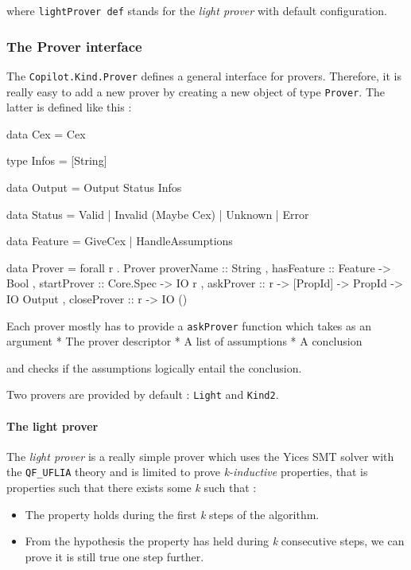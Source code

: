 where \texttt{lightProver def} stands for the \emph{light prover} with
default configuration.

\subsubsection{The Prover interface}\label{the-prover-interface}

The \texttt{Copilot.Kind.Prover} defines a general interface for
provers. Therefore, it is really easy to add a new prover by creating a
new object of type \texttt{Prover}. The latter is defined like this :

\begin{code}
data Cex = Cex

type Infos = [String]

data Output = Output Status Infos

data Status
  = Valid
  | Invalid (Maybe Cex)
  | Unknown
  | Error
  
data Feature = GiveCex | HandleAssumptions
  
data Prover = forall r . Prover 
  { proverName     :: String
  , hasFeature     :: Feature -> Bool
  , startProver    :: Core.Spec -> IO r
  , askProver      :: r -> [PropId] -> PropId -> IO Output 
  , closeProver    :: r -> IO () 
  }

\end{code}

Each prover mostly has to provide a \texttt{askProver} function which
takes as an argument * The prover descriptor * A list of assumptions * A
conclusion

and checks if the assumptions logically entail the conclusion.

Two provers are provided by default : \texttt{Light} and \texttt{Kind2}.

\paragraph{The light prover}\label{the-light-prover}

The \emph{light prover} is a really simple prover which uses the Yices
SMT solver with the \texttt{QF\_UFLIA} theory and is limited to prove
\emph{k-inductive} properties, that is properties such that there exists
some \emph{k} such that :

\begin{itemize}
\itemsep1pt\parskip0pt
\item
  The property holds during the first \emph{k} steps of the algorithm.
\item
  From the hypothesis the property has held during \emph{k} consecutive
  steps, we can prove it is still true one step further.
\end{itemize}

